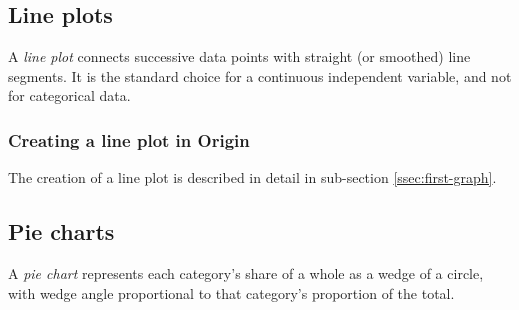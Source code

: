 	\subsection{Line plots}
		A \emph{line plot} connects successive data points with straight (or smoothed) line segments. It is the standard choice for a continuous independent variable, and not for categorical data. %
		
		\subsubsection{Creating a line plot in Origin}
			The creation of a line plot is described in detail in sub-section \ref{ssec:first-graph}.
	
	\subsection{Pie charts}
		A \emph{pie chart} represents each category's share of a whole as a wedge of a circle, with wedge angle proportional to that category's proportion of the total. %
		
